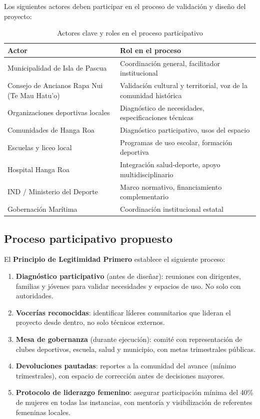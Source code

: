 \documentclass[12pt, a4paper]{article}
\begin{document}
Los siguientes actores deben participar en el proceso de validación y diseño del
proyecto:

\begin{table}[h!]
\centering
\begin{tabularx}{\linewidth}{lX}
\toprule
\textbf{Actor} & \textbf{Rol en el proceso} \\
\midrule
Municipalidad de Isla de Pascua & Coordinación general, facilitador institucional \\
Consejo de Ancianos Rapa Nui (Te Mau Hatu'o) & Validación cultural y territorial, voz de la comunidad histórica \\
Organizaciones deportivas locales & Diagnóstico de necesidades, especificaciones técnicas \\
Comunidades de Hanga Roa & Diagnóstico participativo, usos del espacio \\
Escuelas y liceo local & Programas de uso escolar, formación deportiva \\
Hospital Hanga Roa & Integración salud-deporte, apoyo multidisciplinario \\
IND / Ministerio del Deporte & Marco normativo, financiamiento complementario \\
Gobernación Marítima & Coordinación institucional estatal \\
\bottomrule
\end{tabularx}
\caption{Actores clave y roles en el proceso participativo}
\end{table}

\subsection{Proceso participativo propuesto}

El \textbf{Principio de Legitimidad Primero} \citep{ortega2026} establece el
siguiente proceso:

\begin{enumerate}[leftmargin=*, itemsep=5pt]
  \item \textbf{Diagnóstico participativo} (antes de diseñar): reuniones con
        dirigentes, familias y jóvenes para validar necesidades y espacios de
        uso. No solo con autoridades.
  \item \textbf{Vocerías reconocidas}: identificar líderes comunitarios que lideran
        el proyecto desde dentro, no solo técnicos externos.
  \item \textbf{Mesa de gobernanza} (durante ejecución): comité con representación
        de clubes deportivos, escuela, salud y municipio, con metas trimestrales
        públicas.
  \item \textbf{Devoluciones pautadas}: reportes a la comunidad del avance
        (mínimo trimestrales), con espacio de corrección antes de decisiones
        mayores.
  \item \textbf{Protocolo de liderazgo femenino}: asegurar participación mínima
        del 40\% de mujeres en todas las instancias, con mentoría y visibilización
        de referentes femeninas locales.
\end{enumerate}
\end{document}
